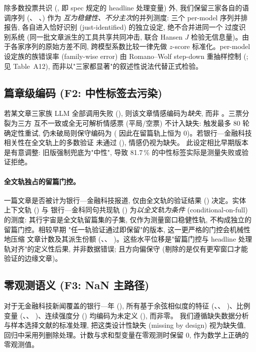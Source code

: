 除多数投票共识 (, 即 spec 规定的
headline 处理变量) 外,
我们保留三家各自的语调序列 (、
、) 作为
\emph{互为稳健性、不分主次}的并列测度: 三个 per-model 序列并排报告,
各自进入恰好识别 (just-identified) 的独立设定, 绝不合并进同一个
过度识别系统 (同一批文章派生的工具共享共同冲击, 联合 Hansen $J$
检验无信息量)。由于各家序列的原始方差不同, 跨模型系数比较一律先做
$z$-score 标准化。per-model 设定族的族错误率 (family-wise error)
由 Romano--Wolf step-down 重抽样控制 (; 见
Table~A12), 而非以"三家都显著"的叙述性说法代替正式检验。

\subsection{篇章级编码 (F2: 中性标签去污染)}
若某文章三家族 LLM 全部调用失败 (),
则该文章情感编码为\emph{缺失}, 而非 。三票分裂为三方
互不一致或全无可解析情感票 (平局/空票) 不计入缺失: 触发最多 80 轮
确定性重试, 仍未破局则保守编码为 (
因此在留篇轨上恒为 0)。若银行—金融科技相关性在全文轨上的多数验证
未通过 (), 情感仍视为缺失。
此设定相比早期版本是有意调整: 旧版强制兜底为"中性",
导致 81.7\,\% 的中性标签实际是测量失败或验证拒绝。

\paragraph{全文轨独占的留篇门控。}
一篇文章是否被计为银行—金融科技报道, 仅由全文轨的验证结果
() 决定。实体上下文轨 () 与
银行—金科同句共现轨 () 为\emph{以全文轨为条件}
(conditional-on-full) 的测度: 其行宇宙是全文轨留篇集的子集,
仅作为测量窗口稳健性轨, 不构成独立的留篇门控。相较早期
"任一轨验证通过即保留"的版本, 这一更严格的门控会机械性地压缩
文章计数及其派生份额 (、、
)。这些水平位移是"留篇门控与 headline
处理轨对齐"的定义性后果, 并非数据错误; 且方向偏保守
(剔除的是仅有更窄窗口才能验证的边缘文章)。

\subsection{零观测语义 (F3: NaN 主路径)}
对于无金融科技新闻覆盖的银行—年 (),
所有基于余弦相似度的特征 (、、
)、比例变量
(、、
)、连续强度分 ()
均编码为未定义 (), 而非零。
我们遵循缺失数据分析与样本选择文献的标准处理, 把这类设计性缺失
(missing by design) 视为缺失值, 回归中采用列删除处理。计数与求和型变量在零观测时保留 $0$,
作为数学上正确的零观测值。

